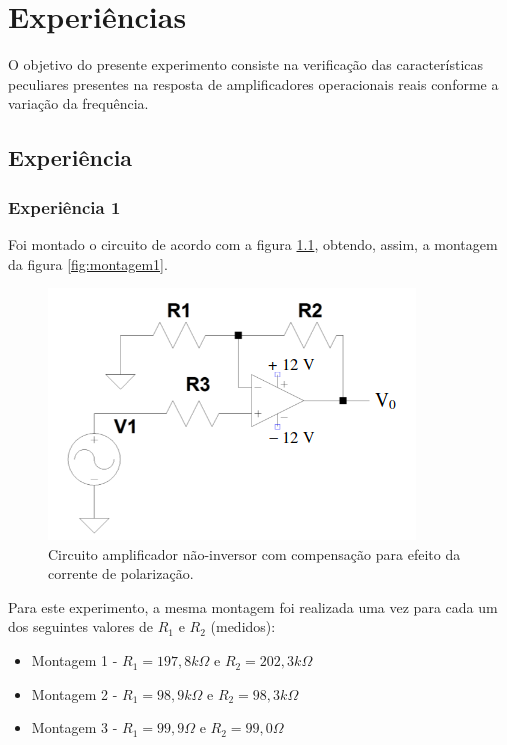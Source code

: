 \documentclass{abntex2}
\begin{document}
\imprimircapa
\imprimirfolhaderosto

\tableofcontents
\clearpage
\listoffigures
\listoftables
\clearpage


\chapter{Experiências}

 O objetivo do presente experimento consiste na verificação das características peculiares presentes na resposta
 de amplificadores operacionais reais conforme a variação da frequência.

\section{Experiência}
\subsection{Experiência 1}

Foi montado o circuito de acordo com a figura \ref{fig:circuito}, obtendo, assim, a montagem da figura \ref{fig:montagem1}.
\begin{figure}[h]
  \centering
  \includegraphics[scale = 0.5]{circuito.png}
  \caption{Circuito amplificador não-inversor com compensação para efeito da corrente de polarização.}
  \label{fig:circuito}
\end{figure}

Para este experimento, a mesma montagem foi realizada uma vez para cada um dos seguintes valores de $R_1$ e $R_2$ (medidos):
\begin{itemize}
  \item Montagem 1 - $R_1 = 197,8k\Omega$ e $R_2 = 202,3k\Omega$
  \item Montagem 2 - $R_1 = 98,9k\Omega$ e $R_2 = 98,3k\Omega$
  \item Montagem 3 - $R_1 = 99,9\Omega$ e $R_2 = 99,0\Omega$
\end{itemize}
\end{document}
